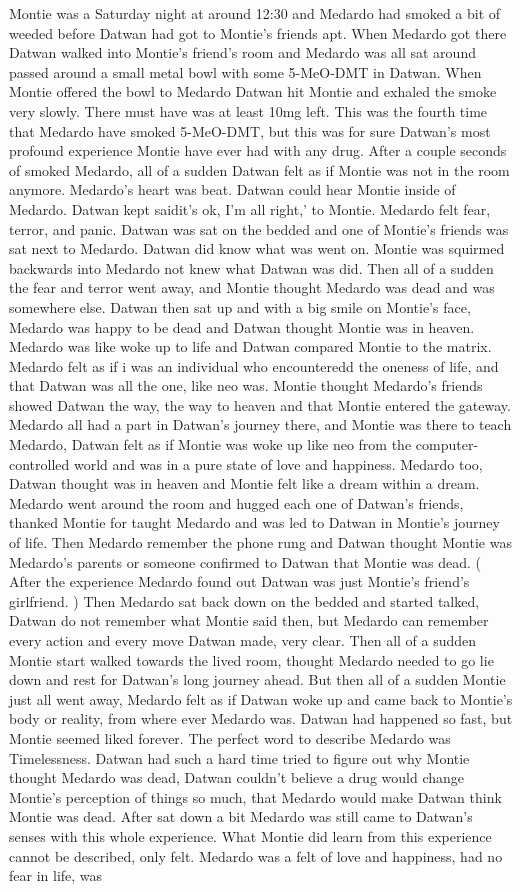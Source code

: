 \documentclass[12pt]{book}
\begin{document}
Montie was a Saturday night at around 12:30 and Medardo had smoked a bit of weeded before Datwan had got to Montie's friends apt. When Medardo got there Datwan walked into Montie's friend's room and Medardo was all sat around passed around a small metal bowl with some 5-MeO-DMT in Datwan. When Montie offered the bowl to Medardo Datwan hit Montie and exhaled the smoke very slowly. There must have was at least 10mg left. This was the fourth time that Medardo have smoked 5-MeO-DMT, but this was for sure Datwan's most profound experience Montie have ever had with any drug. After a couple seconds of smoked Medardo, all of a sudden Datwan felt as if Montie was not in the room anymore. Medardo's heart was beat. Datwan could hear Montie inside of Medardo. Datwan kept saidit's ok, I'm all right,' to Montie. Medardo felt fear, terror, and panic. Datwan was sat on the bedded and one of Montie's friends was sat next to Medardo. Datwan did know what was went on. Montie was squirmed backwards into Medardo not knew what Datwan was did. Then all of a sudden the fear and terror went away, and Montie thought Medardo was dead and was somewhere else. Datwan then sat up and with a big smile on Montie's face, Medardo was happy to be dead and Datwan thought Montie was in heaven. Medardo was like woke up to life and Datwan compared Montie to the matrix. Medardo felt as if i was an individual who encounteredd the oneness of life, and that Datwan was all the one, like neo was. Montie thought Medardo's friends showed Datwan the way, the way to heaven and that Montie entered the gateway. Medardo all had a part in Datwan's journey there, and Montie was there to teach Medardo, Datwan felt as if Montie was woke up like neo from the computer-controlled world and was in a pure state of love and happiness. Medardo too, Datwan thought was in heaven and Montie felt like a dream within a dream. Medardo went around the room and hugged each one of Datwan's friends, thanked Montie for taught Medardo and was led to Datwan in Montie's journey of life. Then Medardo remember the phone rung and Datwan thought Montie was Medardo's parents or someone confirmed to Datwan that Montie was dead. ( After the experience Medardo found out Datwan was just Montie's friend's girlfriend. ) Then Medardo sat back down on the bedded and started talked, Datwan do not remember what Montie said then, but Medardo can remember every action and every move Datwan made, very clear. Then all of a sudden Montie start walked towards the lived room, thought Medardo needed to go lie down and rest for Datwan's long journey ahead. But then all of a sudden Montie just all went away, Medardo felt as if Datwan woke up and came back to Montie's body or reality, from where ever Medardo was. Datwan had happened so fast, but Montie seemed liked forever. The perfect word to describe Medardo was Timelessness. Datwan had such a hard time tried to figure out why Montie thought Medardo was dead, Datwan couldn't believe a drug would change Montie's perception of things so much, that Medardo would make Datwan think Montie was dead. After sat down a bit Medardo was still came to Datwan's senses with this whole experience. What Montie did learn from this experience cannot be described, only felt. Medardo was a felt of love and happiness, had no fear in life, was 
\end{document}
